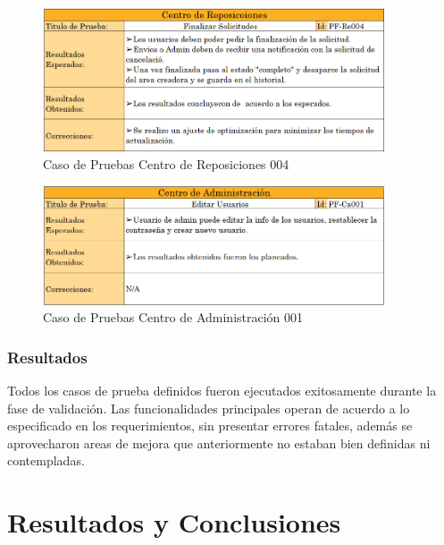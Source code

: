 \documentclass[12pt,letterpaper,spanish]{report}
\begin{document}
\begin{figure}[H]
  \centering
  \includegraphics[width=0.9\textwidth]{Rep_04.png}
  \caption{Caso de Pruebas Centro de Reposiciones 004}\label{Pe004}
\end{figure}


\begin{figure}[H]
  \centering
  \includegraphics[width=0.9\textwidth]{Admi_01.png}
  \caption{Caso de Pruebas Centro de Administración 001}\label{Adm001}
\end{figure}


\subsection{Resultados}
Todos los casos de prueba definidos fueron ejecutados exitosamente durante la fase de validaci\'on. Las funcionalidades principales operan de acuerdo a lo especificado en los requerimientos, sin presentar errores fatales, además se aprovecharon areas de mejora que anteriormente no estaban bien definidas ni contempladas.






\chapter{Resultados y Conclusiones}
\newpage
\end{document}
